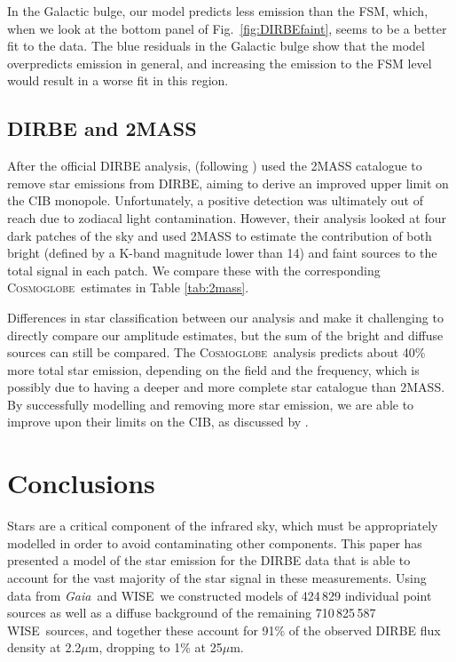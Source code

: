 \documentclass{aa}
\def\Cosmoglobe{\textsc{Cosmoglobe}}
\def\Gaia{\textit{Gaia}}
\def\WISE{WISE}
\begin{document}
In the Galactic bulge, our model predicts less emission than the FSM, which, when we look at the bottom panel of Fig.~\ref{fig:DIRBEfaint}, seems to be a better fit to the data. The blue residuals in the Galactic bulge show that the model overpredicts emission in general, and increasing the emission to the FSM level would result in a worse fit in this region. 

\subsection{DIRBE and 2MASS}

After the official DIRBE analysis, \cite{DIRBE2mass} (following \citealp{gorjian}) used the 2MASS catalogue to remove star emissions from DIRBE, aiming to derive an improved upper limit on the CIB monopole. Unfortunately, a positive detection was ultimately out of reach due to zodiacal light contamination. However, their analysis looked at four dark patches of the sky and used 2MASS to estimate the contribution of both bright (defined by a K-band magnitude lower than 14) and faint sources to the total signal in each patch. We compare these with the corresponding \Cosmoglobe\ estimates in Table \ref{tab:2mass}.

Differences in star classification between our analysis and \cite{DIRBE2mass} make it challenging to directly compare our amplitude estimates, but the sum of the bright and diffuse sources can still be compared. The \Cosmoglobe\ analysis predicts about 40\% more total star emission, depending on the field and the frequency, which is possibly due to having a deeper and more complete star catalogue than 2MASS. By successfully modelling and removing more star emission, we are able to improve upon their limits on the CIB, as discussed by \cite{CG02_03}. 

\section{Conclusions}
\label{sec:conclusions}

Stars are a critical component of the infrared sky, which must be appropriately modelled in order to avoid contaminating other components. This paper has presented a model of the star emission for the DIRBE data that is able to account for the vast majority of the star signal in these measurements. Using data from \Gaia\ and \WISE\, we constructed models of 424\,829 individual point sources as well as a diffuse background of the remaining 710\,825\,587 \WISE\ sources, and together these account for 91\% of the observed DIRBE flux density at 2.2$\mu$m, dropping to 1\% at 25$\mu$m.
\end{document}
